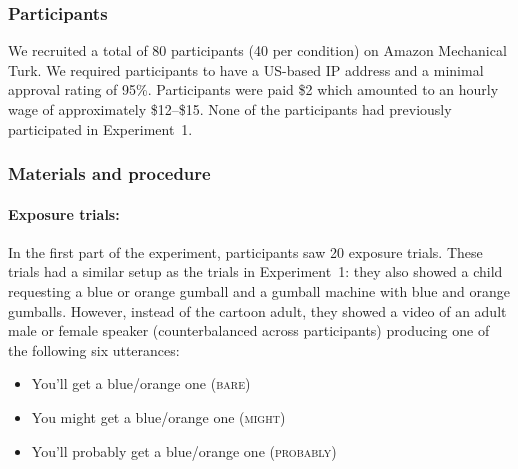 \documentclass[man, floatsintext]{apa6}
\begin{document}
\subsubsection{Participants}
We recruited a total of 80 participants (40 per condition) on Amazon Mechanical Turk. 
We required participants to have a US-based IP address and a minimal approval rating 
of 95\%. Participants were paid \$2 which amounted to an hourly wage of approximately 
\$12--\$15. None of the participants had previously participated in Experiment~1.

\subsubsection{Materials and procedure}

\paragraph{Exposure trials:} In the first part of the experiment, participants saw 20 exposure trials. 
These trials had a similar setup as the trials in Experiment~1: 
they also showed a child requesting a blue or orange gumball and a gumball machine with blue and orange gumballs. 
However, instead of the cartoon adult, they showed a video of an adult male or female speaker (counterbalanced across participants) producing one of the following six utterances:

\begin{itemize}
\item You'll get a blue/orange one (\textsc{bare})
\item You might get a blue/orange one (\textsc{might})
\item You'll probably get a blue/orange one (\textsc{probably})
\end{itemize}
\end{document}

